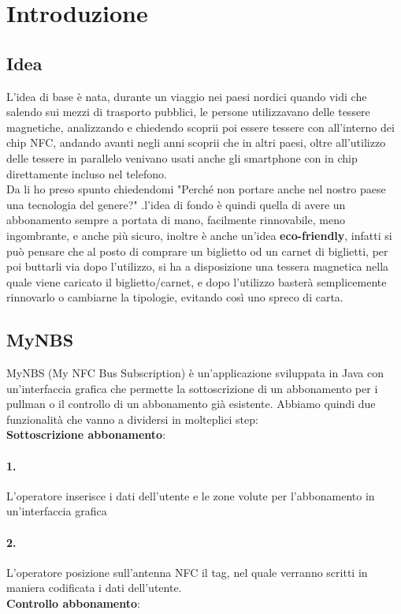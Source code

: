 \section{Introduzione}

\subsection{Idea}

L'idea di base è nata, durante un viaggio nei paesi nordici quando vidi che salendo sui mezzi di trasporto pubblici, le persone utilizzavano delle tessere magnetiche, analizzando e chiedendo scoprii poi essere tessere con all'interno dei chip NFC, andando avanti negli anni scoprii che in altri paesi, oltre all'utilizzo delle tessere in parallelo venivano usati anche gli smartphone con in chip direttamente incluso nel telefono.
\\Da li ho preso spunto chiedendomi "Perché non portare anche nel nostro paese una tecnologia del genere?" .l'idea di fondo è quindi quella di avere un abbonamento sempre a portata di mano, facilmente rinnovabile, meno ingombrante, e anche più sicuro, inoltre è anche un'idea \textbf{eco-friendly}, infatti si può pensare che al posto di comprare un biglietto od un carnet di biglietti, per poi buttarli via dopo l'utilizzo, si ha a disposizione una tessera magnetica nella quale viene caricato il biglietto/carnet, e dopo l'utilizzo basterà semplicemente rinnovarlo o cambiarne la tipologie, evitando così uno spreco di carta.

\subsection{MyNBS}

MyNBS (My NFC Bus Subscription) è un'applicazione sviluppata in Java con un'interfaccia grafica che permette la sottoscrizione di un abbonamento per i pullman o il controllo di un abbonamento già esistente. Abbiamo quindi due funzionalità che vanno a dividersi in molteplici step: 
\\ \textbf{Sottoscrizione abbonamento}:
\paragraph{1.} L'operatore inserisce i dati dell'utente e le zone volute per l'abbonamento in un'interfaccia grafica
\paragraph{2.} L'operatore posizione sull'antenna NFC il tag, nel quale verranno scritti in maniera codificata i dati dell'utente.
\bigskip
\\\textbf{Controllo abbonamento}:
